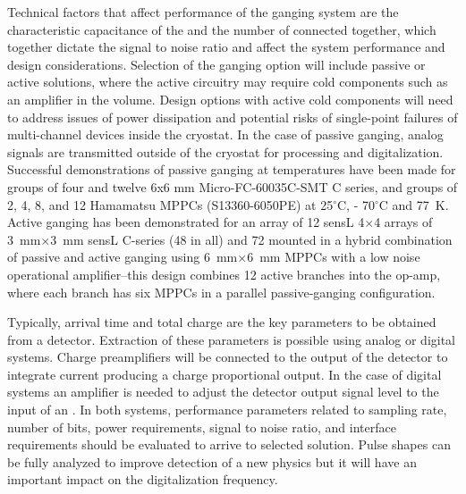 Technical factors that affect performance of the ganging system are the characteristic capacitance of the  
and the number of  connected together, which together dictate the signal to noise ratio and affect the system 
performance and design considerations. Selection of the ganging option will include passive or active solutions, where the active 
circuitry may require cold components such as an amplifier in the \lar volume. Design options with active cold components will need 
to address issues of power dissipation and potential risks of single-point failures of multi-channel devices inside the cryostat.
In the case of passive ganging, analog signals are transmitted outside of the cryostat for processing and digitalization. 
Successful demonstrations of passive ganging at \lar temperatures have been made for groups of four and twelve 6x6 mm Micro-FC-60035C-SMT C series, and groups of 2, 4, 8, and 12  Hamamatsu MPPCs (S13360-6050PE) at  \num{25}$^\circ$C, - \num{70}$^\circ$C and \SI{77}{K}. Active ganging has been demonstrated for an array of 12 sensL \num{4}$\times$\num{4} arrays of \SI{3}{mm}$\times$\SI{3}{mm} sensL C-series  (48 in all) and  72  mounted in a hybrid combination of passive and active ganging using \SI{6}{mm}$\times$\SI{6}{mm} MPPCs with a low noise operational amplifier--this design combines 12 active branches into the op-amp, where each branch has six MPPCs in a parallel passive-ganging configuration.

Typically, arrival time and total charge are the key parameters to be obtained from a detector. Extraction of these parameters 
is possible using analog or digital systems. Charge preamplifiers will be connected to the output of the detector to integrate 
current producing a charge proportional output. In the case of digital systems an amplifier is needed to adjust the detector output signal 
level to the input of an .  In both systems, performance parameters related  to sampling rate, number of bits, 
power requirements, signal to noise ratio, and interface requirements should be evaluated to arrive to selected solution.  
Pulse shapes can be fully analyzed to improve detection of a new physics but it will have an important impact on the digitalization frequency.

